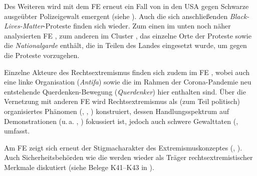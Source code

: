 Des Weiteren wird mit dem FE  erneut ein Fall von in den USA gegen Schwarze ausgeübter Polizeigewalt emergent (siehe ). Auch die sich anschließenden \emph{Black-Lives-Matter}-Proteste finden sich wieder. Zum einen im unten noch näher analysierten FE , zum anderen im Cluster , das einzelne Orte der Proteste sowie die \emph{Nationalgarde} enthält, die in Teilen des Landes eingesetzt wurde, um gegen die Proteste vorzugehen.

Einzelne Akteure des Rechtsextremismus finden sich zudem im FE , wobei auch eine linke Organisation (\emph{Antifa}) sowie die im Rahmen der Corona-Pandemie neu entstehende Querdenken-Bewegung (\emph{Querdenker}) hier enthalten sind. Über die Vernetzung mit anderen FE wird Rechtsextremismus als (zum Teil politisch) organisiertes Phänomen (, , ) konstruiert, dessen Handlungsspektrum auf Demonstrationen (u.\,a. , ) fokussiert ist, jedoch auch schwere Gewalttaten (,  umfasst.

Am FE  zeigt sich erneut der Stigmacharakter des Extremismuskonzeptes (, ). Auch Sicherheitsbehörden wie die  werden wieder als Träger rechtsextremistischer Merkmale diskutiert (siehe Belege K41--K43 in ).

